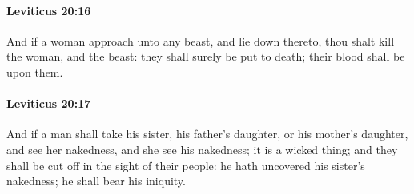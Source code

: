 		\paragraph{Leviticus 20:16} %
			\label{LEVITICUS-20-16}

			And if a woman approach unto any beast, and lie down thereto, thou shalt kill the woman, and the beast: they shall surely be put to death; their blood shall be upon them.


		\paragraph{Leviticus 20:17} %
			\label{LEVITICUS-20-17}

			And if a man shall take his sister, his father’s daughter, or his mother’s daughter, and see her nakedness, and she see his nakedness; it is a wicked thing; and they shall be cut off in the sight of their people: he hath uncovered his sister’s nakedness; he shall bear his iniquity.

